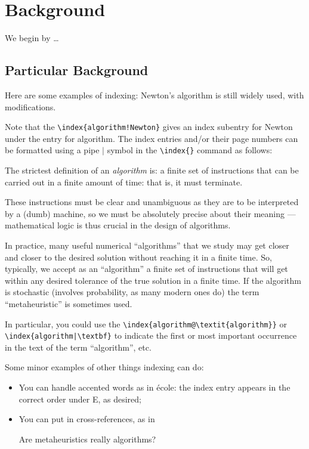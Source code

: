\section{Background}\label{S.intro1}

We begin by \ldots

\subsection{Particular Background}\label{SS.xyz}

Here are some examples of indexing: Newton's algorithm is
still widely used, with modifications.

Note that the \verb|\index{algorithm!Newton}| gives an index subentry for Newton under the entry for algorithm.
The index entries and/or their page numbers can be formatted using a pipe $|$ symbol in the \verb!\index{}!
command as follows:

\begin{defn}
The strictest definition of an \emph{algorithm} is: a finite set of instructions
that can be carried out in a finite amount of time: that is, it must terminate.

These instructions must be clear and unambiguous as they are to be interpreted by a (dumb)
machine, so we must be absolutely precise about their meaning --- mathematical logic is
thus crucial in the design of algorithms.
\end{defn}

In practice, many useful numerical ``algorithms'' that we study may get closer and closer
to the desired solution without reaching it in a finite time.  So, typically, we accept as an
``algorithm'' a finite set of instructions that will get within any desired tolerance
of the true solution in a finite time.
If the algorithm is stochastic (involves probability, as many modern ones do) the term
``metaheuristic'' is sometimes used.

In particular, you could use the \verb|\index{algorithm@\textit{algorithm}}| or \verb!\index{algorithm|\textbf}! to
indicate the first or most important occurrence in the text of the term ``algorithm'', etc.

Some minor examples of other things indexing can do:
\begin{itemize}
\item You can handle accented words as in \'ecole: the index entry appears in the correct
order under E, as desired;
\item You can put in cross-references, as in

Are metaheuristics really algorithms?
\end{itemize}

